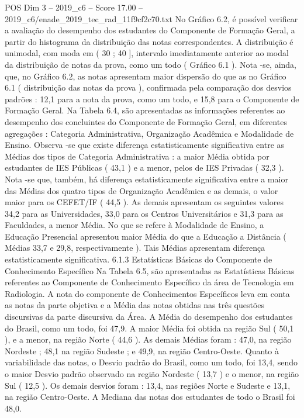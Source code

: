\begin{textsample}{POS Dim 3 – 2019\_c6 – Score 17.00 – 2019\_c6/enade\_2019\_tec\_rad\_11f9cf2c70.txt}
No Gráfico 6.2, é possível verificar a avaliação do desempenho dos estudantes do Componente de Formação Geral, a partir do histograma da distribuição das notas correspondentes.
A distribuição é unimodal, com moda em ( 30 ; 40 ], intervalo imediatamente anterior ao modal da distribuição de notas da prova, como um todo ( Gráfico 6.1 ).
Nota -se, ainda, que, no Gráfico 6.2, as notas apresentam maior dispersão do que as no Gráfico 6.1 ( distribuição das notas da prova ), confirmada pela comparação dos desvios padrões : 12,1 para a nota da prova, como um todo, e 15,8 para o Componente de Formação Geral.
Na Tabela 6.4, são apresentadas as informações referentes ao desempenho dos concluintes do Componente de Formação Geral, em diferentes agregações : Categoria Administrativa, Organização Acadêmica e Modalidade de Ensino.
Observa -se que existe diferença estatisticamente significativa entre as Médias dos tipos de Categoria Administrativa : a maior Média obtida por estudantes de IES Públicas ( 43,1 ) e a menor, pelos de IES Privadas ( 32,3 ).
Nota -se que, também, há diferença estatisticamente significativa entre a maior das Médias dos quatro tipos de Organização Acadêmica e as demais, o valor maior para os CEFET/IF ( 44,5 ).
As demais apresentam os seguintes valores 34,2 para as Universidades, 33,0 para os Centros Universitários e 31,3 para as Faculdades, a menor Média.
No que se refere à Modalidade de Ensino, a Educação Presencial apresentou maior Média do que a Educação a Distância ( Médias 33,7 e 29,8, respectivamente ).
Tais Médias apresentam diferença estatisticamente significativa. 6.1.3 Estatísticas Básicas do Componente de Conhecimento Específico Na Tabela 6.5, são apresentadas as Estatísticas Básicas referentes ao Componente de Conhecimento Específico da área de Tecnologia em Radiologia.
A nota do componente de Conhecimentos Específicos leva em conta as notas da parte objetiva e a Média das notas obtidas nas três questões discursivas da parte discursiva da Área.
A Média do desempenho dos estudantes do Brasil, como um todo, foi 47,9.
A maior Média foi obtida na região Sul ( 50,1 ), e a menor, na região Norte ( 44,6 ).
As demais Médias foram : 47,0, na região Nordeste ; 48,1 na região Sudeste ; e 49,9, na região Centro-Oeste.
Quanto à variabilidade das notas, o Desvio padrão do Brasil, como um todo, foi 13,4, sendo o maior Desvio padrão observado na região Nordeste ( 13,7 ) e o menor, na região Sul ( 12,5 ).
Os demais desvios foram : 13,4, nas regiões Norte e Sudeste e 13,1, na região Centro-Oeste.
A Mediana das notas dos estudantes de todo o Brasil foi 48,0.

\end{textsample}
